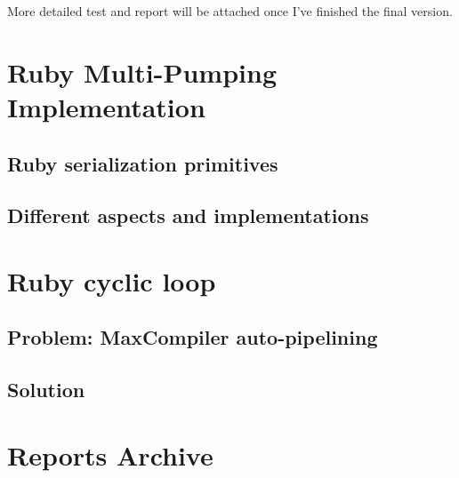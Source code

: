 \documentclass[a4paper, 10pt]{article}
\begin{document}
More detailed test and report will be attached once I've finished the final version.

\section{Ruby Multi-Pumping Implementation}

\subsection{Ruby serialization primitives}

\subsection{Different aspects and implementations}

\section{Ruby cyclic loop}

\subsection{Problem: MaxCompiler auto-pipelining}

\subsection{Solution}

\newpage

\section{Reports Archive}
 \newpage
 \newpage
   
\end{document}
